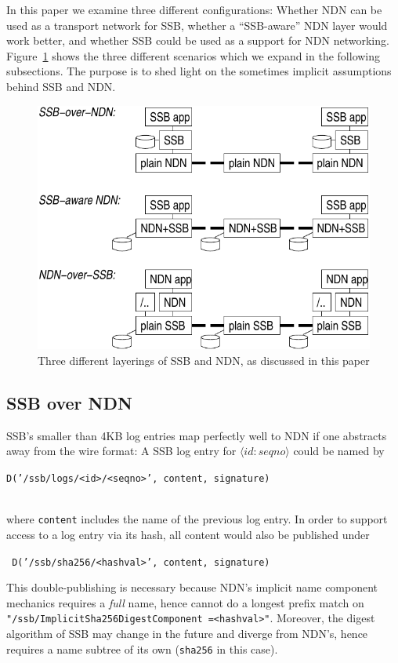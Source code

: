 \documentclass[10pt,sigconf,rewiew]{acmart}
\begin{document}
In this paper we examine three different configurations: Whether NDN
can be used as a transport network for SSB, whether a ``SSB-aware''
NDN layer would work better, and whether SSB could be used as a
support for NDN networking. Figure~\ref{fig:ssb-and-ndn} shows the
three different scenarios which we expand in the following
subsections. The purpose is to shed light on the sometimes implicit
assumptions behind SSB and NDN.

\begin{figure}[htb]
  \raggedright
  \includegraphics[width=0.9\columnwidth]{figs/ssb-and-ndn.pdf}
  \caption{\label{fig:ssb-and-ndn}Three different layerings of SSB and NDN,
    as discussed in this paper}
\end{figure}

\subsection{SSB over NDN}
\label{ssect:ssb-over-ndn}

SSB's smaller than 4KB log entries map perfectly well to NDN if one
abstracts away from the wire format: A SSB
log entry for \mbox{$\langle id:seqno\rangle$} could be named by\\
  \centerline{\tt D('/ssb/logs/<id>/<seqno>', content, signature)} \\
where {\tt content} includes the name of the previous log entry.
In order to support access to a log entry via its hash, all content
would also be published under\\
\centerline{\tt
 D('/ssb/sha256/<hashval>', content, signature)}

\noindent
This double-publishing is necessary because NDN's implicit name
component mechanics requires a {\em full} name, hence cannot do a longest
prefix match on {\tt
 "/ssb/ImplicitSha256DigestComponent =<hashval>"}. Moreover, the digest
algorithm of SSB may change in the future and diverge from NDN's, hence
requires a name subtree of its own ({\tt sha256} in this case).
\end{document}
